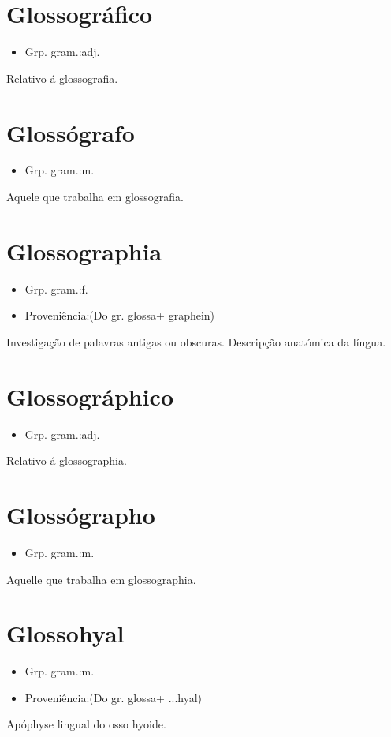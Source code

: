 \section{Glossográfico}
\begin{itemize}
\item {Grp. gram.:adj.}
\end{itemize}
Relativo á glossografia.
\section{Glossógrafo}
\begin{itemize}
\item {Grp. gram.:m.}
\end{itemize}
Aquele que trabalha em glossografia.
\section{Glossographia}
\begin{itemize}
\item {Grp. gram.:f.}
\end{itemize}
\begin{itemize}
\item {Proveniência:(Do gr. \textunderscore glossa\textunderscore  + \textunderscore graphein\textunderscore )}
\end{itemize}
Investigação de palavras antigas ou obscuras.
Descripção anatómica da língua.
\section{Glossográphico}
\begin{itemize}
\item {Grp. gram.:adj.}
\end{itemize}
Relativo á glossographia.
\section{Glossógrapho}
\begin{itemize}
\item {Grp. gram.:m.}
\end{itemize}
Aquelle que trabalha em glossographia.
\section{Glossohyal}
\begin{itemize}
\item {Grp. gram.:m.}
\end{itemize}
\begin{itemize}
\item {Proveniência:(Do gr. \textunderscore glossa\textunderscore  + \textunderscore ...hyal\textunderscore )}
\end{itemize}
Apóphyse lingual do osso hyoide.
